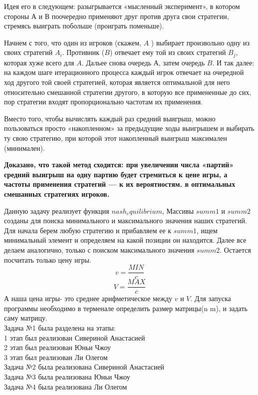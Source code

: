 \documentclass[12pt,a4paper]{paper}
\begin{document}
Идея его в следующем: разыгрывается «мысленный эксперимент», в котором стороны $А$ и $В$ поочередно применяют друг против друга свои стратегии, стремясь выиграть побольше (проиграть поменьше).

Начнем с того, что один из игроков (скажем, $A$ ) выбирает произвольно одну из своих стратегий $A_i$. Противник ($B$) отвечает ему той из своих стратегий $B_j$, которая хуже всего для $A$. Дальее снова очередь $А$, затем очередь $B$. И так далее: на каждом шаге итерационного процесса каждый игрок отвечает на очередной ход другого той своей стратегией, которая является оптимальной для него относительно смешанной стратегии другого, в которую все примененные до сих, пор стратегии входят пропорционально частотам их применения. 

Вместо того, чтобы вычислять каждый раз средний выигрыш, можно пользоваться просто «накопленном» за предыдущие ходы выигрышем и выбирать ту свою стратегию, при которой этот накопленный выигрыш максимален (минимален). 

\bfseries{Доказано, что такой метод сходится: при увеличении числа «партий» средний выигрыш на одну партию будет стремиться к цене игры, а частоты применения стратегий — к их вероятностям. в оптимальных смешанных стратегиях игроков.} \mdseries


Данную задачу реализует функция $nash_equilibrium$, 
Массивы $summ1$ и $summ2$ созданы для поиска минимального  и максимального значения наших стратегий. Для начала берем любую стратегию и прибавляем ее к $summ1$, ищем минимальный элемент и определяем на какой позиции он находится. Далее все делаем аналогично, только с поиском максимального значения $summ2$.
Остается посчитать только цену игры.
$$v = \frac{MIN}{c}$$
$$V = \frac{MAX}{c}$$
А наша цена игры- это среднее арифметическое между $v$ и $V$.
\hline  \hline
Для запуска программы необходимо в терменале определить размер матрицы(n m), и задать саму матрицу.\\  
\hline  \hline
Задача №1 была разделена на этапы:\\

1 этап был реализован Сивериной Анастасией\\

2 этап был реализован Юньи Чжоу\\

3 этап был реализован Ли Олегом\\

Задача №2 была реализована Сивериной Анастасией\\

Задача №3 была реализована Юньи Чжоу\\

Задача №4 была реализована Ли Олегом\\
\end{document}
